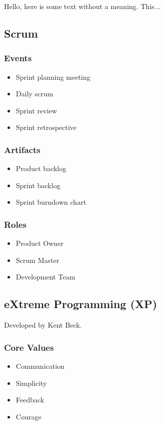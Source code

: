 \documentclass[../ESOF_notes.tex]{subfiles}
\begin{document}
Hello, here is some text without a meaning.  This...
\subsection{Scrum}
\subsubsection{Events}
\begin{itemize}
    \item Sprint planning meeting
    \item Daily scrum
    \item Sprint review
    \item Sprint retrospective
\end{itemize}

\subsubsection{Artifacts}

\begin{itemize}
    \item Product backlog
    \item Sprint backlog
    \item Sprint burndown chart
\end{itemize}

\subsubsection{Roles}

\begin{itemize}
    \item Product Owner
    \item Scrum Master
    \item Development Team
\end{itemize}

\subsection{eXtreme Programming (XP)}

Developed by Kent Beck.

\subsubsection{Core Values}

\begin{itemize}
    \item Communication
    \item Simplicity
    \item Feedback
    \item Courage
\end{itemize}
\end{document}
